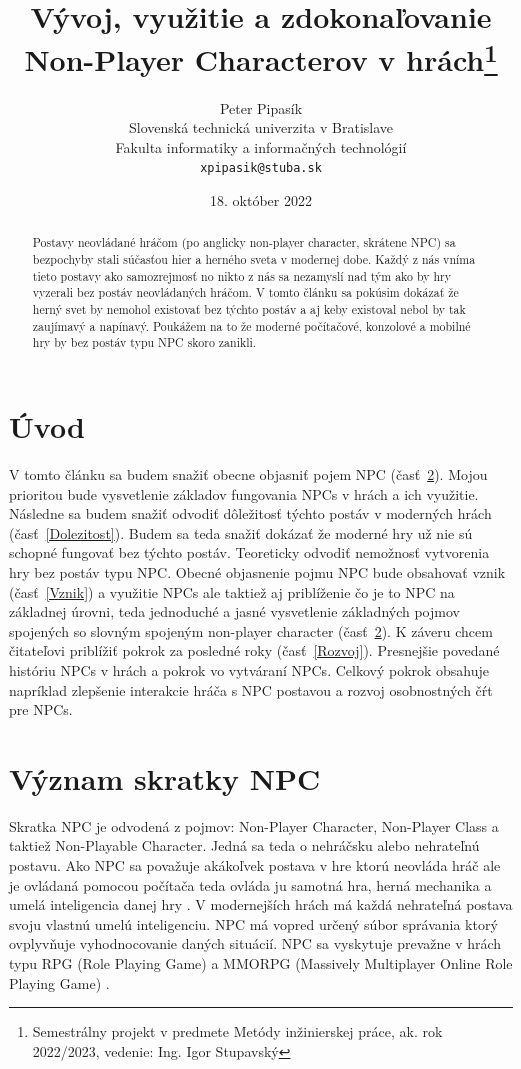 \documentclass[10pt,twoside,slovak,a4paper]{article}
\title{Vývoj, využitie a zdokonaľovanie Non-Player Characterov v hrách\thanks{Semestrálny projekt v predmete Metódy inžinierskej práce, ak. rok 2022/2023, vedenie: Ing. Igor Stupavský}}
\author{Peter Pipasík\\[2pt]
	{\small Slovenská technická univerzita v Bratislave}\\
	{\small Fakulta informatiky a informačných technológií}\\
	{\small \texttt{xpipasik@stuba.sk}}
	}
\date{\small 18. október 2022}
\begin{document}
\maketitle


\begin{abstract}
Postavy neovládané hráčom (po anglicky non-player character, skrátene NPC) sa bezpochyby stali súčasťou hier a herného sveta v modernej dobe. Každý z nás vníma tieto postavy ako samozrejmosť no nikto z nás sa nezamyslí nad tým ako by hry vyzerali bez postáv neovládaných hráčom. V tomto článku sa pokúsim dokázať že herný svet by nemohol existovať
bez týchto postáv a aj keby existoval nebol by tak zaujímavý a napínavý. Poukážem na to že moderné počítačové, konzolové a mobilné hry by bez postáv typu NPC skoro zanikli.
   

\end{abstract}

\section{Úvod}
V tomto článku sa budem snažiť obecne objasniť pojem NPC (časť~\ref{Vyznam skratky}). Mojou prioritou bude vysvetlenie základov fungovania NPCs v hrách a ich využitie. Následne sa budem snažiť odvodiť dôležitosť týchto postáv v moderných hrách (časť~\ref{Dolezitost}). Budem sa teda snažiť dokázať že moderné hry už nie sú schopné fungovať bez týchto postáv. Teoreticky odvodiť nemožnosť vytvorenia hry bez postáv typu NPC.
Obecné objasnenie pojmu NPC bude obsahovať vznik (časť~\ref{Vznik}) a využitie NPCs ale taktiež aj priblíženie čo je to NPC na základnej úrovni, teda jednoduché a jasné vysvetlenie základných pojmov spojených so slovným spojeným non-player character (časť~\ref{Vyznam skratky}).
K záveru chcem čitateľovi priblížiť pokrok za posledné roky (časť~\ref{Rozvoj}). Presnejšie povedané históriu NPCs v hrách a pokrok vo vytváraní NPCs. Celkový pokrok obsahuje napríklad zlepšenie interakcie hráča s NPC postavou a rozvoj osobnostných čŕt pre NPCs. 


\section{Význam skratky NPC}  \label{Vyznam skratky}
Skratka NPC je odvodená z pojmov: Non-Player Character, Non-Player Class a taktiež Non-Playable Character. Jedná sa teda o nehráčsku alebo nehrateľnú postavu. Ako NPC sa považuje akákoľvek postava v hre ktorú neovláda hráč ale je ovládaná pomocou počítača teda ovláda ju samotná hra, herná mechanika a umelá inteligencia danej hry \cite{Hack2018}. V modernejších hrách má každá nehrateľná postava svoju vlastnú umelú inteligenciu. NPC má vopred určený súbor správania ktorý ovplyvňuje vyhodnocovanie daných situácií. NPC sa vyskytuje prevažne v hrách typu RPG (Role Playing Game) a MMORPG (Massively Multiplayer Online Role Playing Game) \cite{9291553}.
\end{document}
